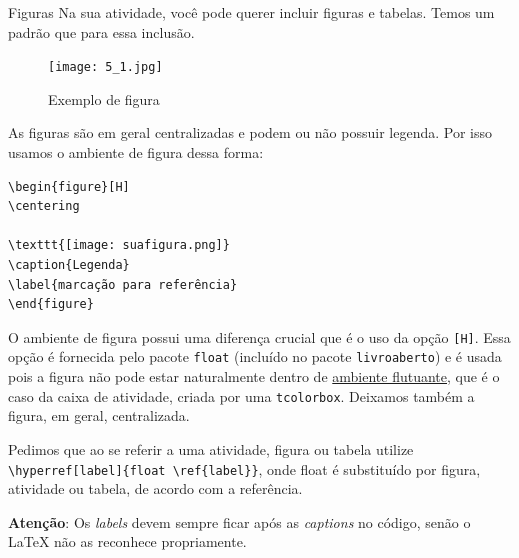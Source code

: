 \begin{task}{Figuras}
Na sua atividade, você pode querer incluir figuras e tabelas. Temos um padrão que para essa inclusão.

\begin{figure}[H]
\centering

\texttt{[image: 5\_1.jpg]}
\caption{Exemplo de figura}
\end{figure}

As figuras são em geral centralizadas e podem ou não possuir legenda. Por isso usamos o ambiente de figura dessa forma:

\begin{verbatim}
\begin{figure}[H]
\centering

\texttt{[image: suafigura.png]}
\caption{Legenda}
\label{marcação para referência}
\end{figure}
\end{verbatim}

O ambiente de figura possui uma diferença crucial que é o uso da opção \verb|[H]|. Essa opção é fornecida pelo pacote \verb|float| (incluído no pacote \verb|livroaberto|) e é usada pois a figura não pode estar naturalmente dentro de \href{https://en.wikibooks.org/wiki/LaTeX/Floats,_Figures_and_Captions}{ambiente flutuante}, que é o caso da caixa de atividade, criada por uma \verb|tcolorbox|. Deixamos também a figura, em geral, centralizada.

Pedimos que ao se referir a uma atividade, figura ou tabela utilize \verb|\hyperref[label]{float \ref{label}}|, onde float é substituído por figura, atividade ou tabela, de acordo com a referência. 

\textbf{Atenção}: Os \textit{labels} devem sempre ficar após as \textit{captions} no código, senão o \LaTeX{} não as reconhece propriamente.
\end{task}

